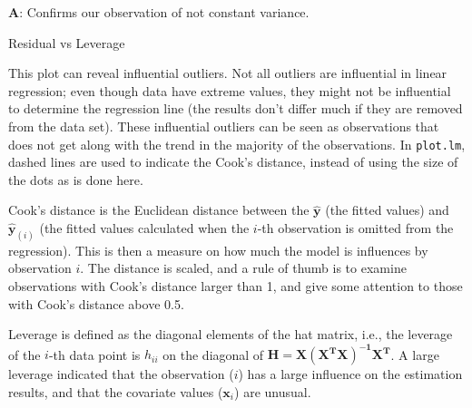 \documentclass[ignorenonframetext,]{beamer}
\begin{document}
\begin{frame}

\textbf{A}: Confirms our observation of not constant variance.

\end{frame}

\begin{frame}[fragile]

\begin{block}{Residual vs Leverage}

This plot can reveal influential outliers. Not all outliers are
influential in linear regression; even though data have extreme values,
they might not be influential to determine the regression line (the
results don't differ much if they are removed from the data set). These
influential outliers can be seen as observations that does not get along
with the trend in the majority of the observations. In \texttt{plot.lm},
dashed lines are used to indicate the Cook's distance, instead of using
the size of the dots as is done here.

\end{block}

\end{frame}

\begin{frame}

Cook's distance is the Euclidean distance between the
\(\mathbf{\hat{y}}\) (the fitted values) and \(\mathbf{\hat{y}}_{(i)}\)
(the fitted values calculated when the \(i\)-th observation is omitted
from the regression). This is then a measure on how much the model is
influences by observation \(i\). The distance is scaled, and a rule of
thumb is to examine observations with Cook's distance larger than 1, and
give some attention to those with Cook's distance above 0.5.

Leverage is defined as the diagonal elements of the hat matrix, i.e.,
the leverage of the \(i\)-th data point is \(h_{ii}\) on the diagonal of
\(\mathbf{H = X(X^TX)^{-1}X^T}\). A large leverage indicated that the
observation (\(i\)) has a large influence on the estimation results, and
that the covariate values (\(\mathbf{x}_i\)) are unusual.

\end{frame}
\end{document}
